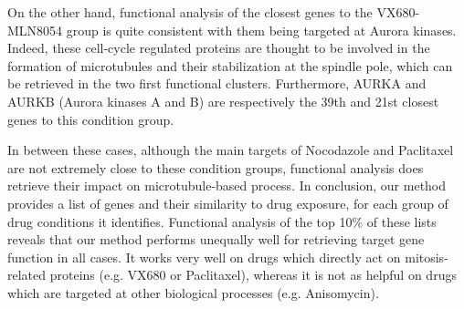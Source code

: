 On the other hand, functional analysis of the closest genes to the
VX680-MLN8054 group is quite consistent with them being targeted at
Aurora kinases. Indeed, these cell-cycle regulated proteins are
thought to be involved in the formation of microtubules and their
stabilization at the spindle pole, which can be retrieved in the two
first functional clusters. Furthermore, AURKA and AURKB (Aurora
kinases A and B) are respectively the 39th and 21st closest genes to
this condition group. 

In between these cases, although the main targets of Nocodazole and Paclitaxel are not extremely close to these condition groups, functional analysis does retrieve their impact on microtubule-based process. In conclusion, our method provides a list of genes and their similarity to drug exposure, for each group of drug conditions it identifies. Functional analysis of the top 10\% of these lists reveals that our method performs unequally well for retrieving target gene function in all cases. It works very well on drugs which directly act on mitosis-related proteins (e.g. VX680 or Paclitaxel), whereas it is not as helpful on drugs which are targeted at other biological processes (e.g. Anisomycin). 


